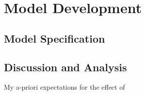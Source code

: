 \section{Model Development}
\subsection{Model Specification}
\subsection{Discussion and Analysis}
My a-priori expectations for the effect of 